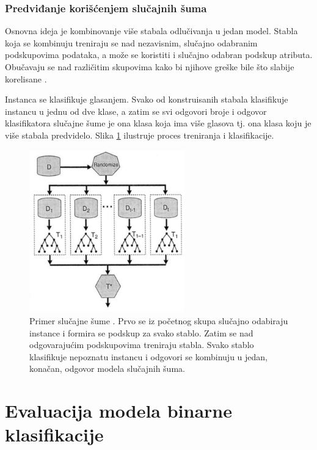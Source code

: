 \subsubsection{Predviđanje korišćenjem slučajnih šuma} 


Osnovna ideja je kombinovanje više stabala odlučivanja u jedan model. Stabla koja se kombinuju treniraju se nad nezavisnim, slučajno odabranim podskupovima podataka, a može se koristiti i slučajno odabran podskup atributa. Obučavaju se nad različitim skupovima kako bi njihove greške bile što slabije korelisane \cite{ml}.  
 
Instanca se klasifikuje glasanjem. Svako od konstruisanih stabala klasifikuje instancu u jednu od dve klase, a zatim se svi odgovori broje i odgovor klasifikatora slučajne šume je ona klasa koja ima više glasova tj. ona klasa koju je više stabala predvidelo. Slika \ref{fig:rf} ilustruje proces treniranja i klasifikacije.


\begin{figure}[H]
	\centering
	\includegraphics[width=0.6\textwidth]{Figures/random_forests.png}
	\caption{Primer slučajne šume \cite{introDM}. Prvo se iz početnog skupa slučajno odabiraju instance i formira se podskup za svako stablo. Zatim se nad odgovarajućim podskupovima treniraju stabla. Svako stablo klasifikuje nepoznatu instancu i odgovori se kombinuju u jedan, konačan, odgovor modela slučajnih šuma.}
	\label{fig:rf}
\end{figure}



\section{Evaluacija modela binarne klasifikacije}
\label{sec:evaluation}

